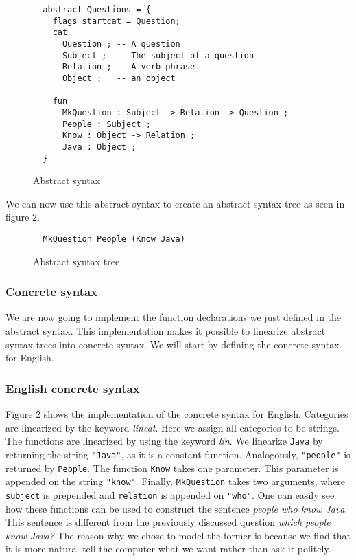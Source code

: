 \captionsetup[figure]{font=small,skip=-5pt}
\begin{figure}[h]
\begin{verbatim}
  abstract Questions = { 
    flags startcat = Question; 
    cat
      Question ; -- A question
      Subject ;  -- The subject of a question
      Relation ; -- A verb phrase
      Object ;   -- an object
	
    fun		 	  
      MkQuestion : Subject -> Relation -> Question ;
      People : Subject ;
      Know : Object -> Relation ;
      Java : Object ; 
  }
\end{verbatim}
\caption{Abstract syntax}
\end{figure}

We can now use this abstract syntax to create an abstract syntax tree as seen in figure 2.

\begin{figure}[h]
\begin{verbatim}
  MkQuestion People (Know Java)
\end{verbatim}
\caption{Abstract syntax tree}
\end{figure}

\subsubsection*{Concrete syntax}

We are now going to implement the function declarations we just defined in the abstract syntax. This implementation makes it possible to linearize abstract syntax trees into concrete syntax. We will start by defining the concrete syntax for English.

\subsubsection*{English concrete syntax}

Figure 2 shows the implementation of the concrete syntax for English. Categories are linearized by the keyword \emph{lincat}. Here we assign all categories to be strings. The functions are linearized by using the keyword \emph{lin}. We linearize \texttt{Java} by returning the string \texttt{"Java"}, as it is a constant function. Analogously, \texttt{"people"} is returned by \texttt{People}. The function \texttt{Know} takes one parameter. This parameter is appended on the string \texttt{"know"}. Finally, \texttt{MkQuestion} takes two arguments, where \texttt{subject} is prepended and \texttt{relation} is appended on \texttt{"who"}. One can easily see how these functions can be used to construct the sentence \emph{people who know Java}. This sentence is different from the previously discussed question \emph{which people know Java?} The reason why we chose to model the former is because we find that it is more natural tell the computer what we want rather than ask it politely.

